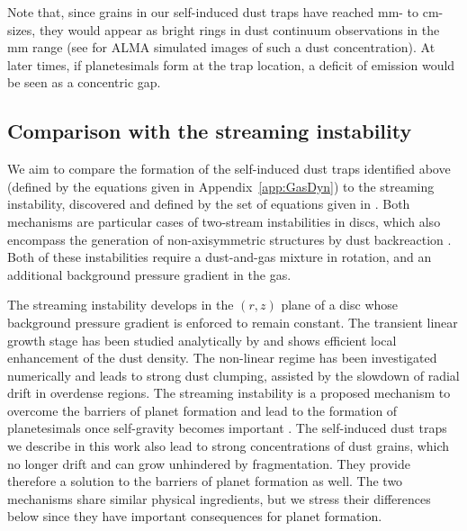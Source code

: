 \documentclass[a4paper,fleqn,usenatbib]{mnras}
\begin{document}
Note that, since grains in our self-induced dust traps have reached mm- to cm-sizes, they would appear as bright rings in dust continuum observations in the mm range (see \citealt{Gonzalez2015b} for ALMA simulated images of such a dust concentration). At later times, if planetesimals form at the trap location, a deficit of emission would be seen as a concentric gap.

\subsection{Comparison with the streaming instability}
\label{sec:SI}

We aim to compare the formation of the self-induced dust traps identified above (defined by the equations given in Appendix~\ref{app:GasDyn}) to the streaming instability, discovered and defined by the set of equations given in \citet{Youdin2005}. Both mechanisms are particular cases of two-stream instabilities in discs, which also encompass the generation of non-axisymmetric structures by dust backreaction \citep{Lyra2013}. Both of these instabilities require a dust-and-gas mixture in rotation, and an additional background pressure gradient in the gas.

The streaming instability develops in the $(r,z)$ plane of a disc whose background pressure gradient is enforced to remain constant. The transient linear growth stage has been studied analytically by \citet{Youdin2005,Youdin2007,Jacquet2011} and shows efficient local enhancement of the dust density. The non-linear regime has been investigated numerically \citep{Johansen2007,Bai2010,Yang2014} and leads to strong dust clumping, assisted by the slowdown of radial drift in overdense regions. The streaming instability is a proposed mechanism to overcome the barriers of planet formation and lead to the formation of planetesimals once self-gravity becomes important \citep{Johansen2007}. The self-induced dust traps we describe in this work also lead to strong concentrations of dust grains, which no longer drift and can grow unhindered by fragmentation. They provide therefore a solution to the barriers of planet formation as well. The two mechanisms share similar physical ingredients, but we stress their differences below since they have important consequences for planet formation.
\end{document}
